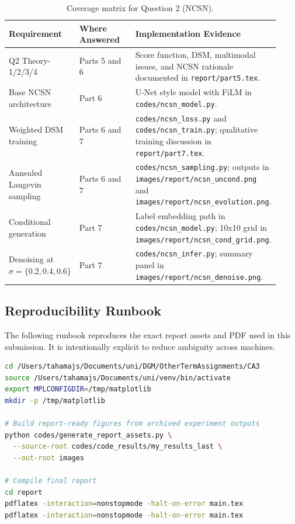 \begin{table}[H]
\centering
\caption{Coverage matrix for Question 2 (NCSN).}
\label{tab:coverage-q2}
\begin{tabular}{@{}p{0.18\linewidth}p{0.27\linewidth}p{0.47\linewidth}@{}}
\toprule
\textbf{Requirement} & \textbf{Where Answered} & \textbf{Implementation Evidence} \\
\midrule
Q2 Theory-1/2/3/4 & Parts 5 and 6 & Score function, DSM, multimodal issues,
and NCSN rationale documented in \texttt{report/part5.tex}. \\
Base NCSN architecture & Part 6 & U-Net style model with FiLM in
\texttt{codes/ncsn\_model.py}. \\
Weighted DSM training & Parts 6 and 7 &
\texttt{codes/ncsn\_loss.py} and \texttt{codes/ncsn\_train.py}; qualitative
training discussion in \texttt{report/part7.tex}. \\
Annealed Langevin sampling & Parts 6 and 7 &
\texttt{codes/ncsn\_sampling.py}; outputs in
\texttt{images/report/ncsn\_uncond.png} and
\texttt{images/report/ncsn\_evolution.png}. \\
Conditional generation & Part 7 & Label embedding path in
\texttt{codes/ncsn\_model.py}; 10x10 grid in
\texttt{images/report/ncsn\_cond\_grid.png}. \\
Denoising at $\sigma=\{0.2,0.4,0.6\}$ & Part 7 &
\texttt{codes/ncsn\_infer.py}; summary panel in
\texttt{images/report/ncsn\_denoise.png}. \\
\bottomrule
\end{tabular}
\end{table}

\subsection{Reproducibility Runbook}

The following runbook reproduces the exact report assets and PDF used in this
submission. It is intentionally explicit to reduce ambiguity across machines.

\begin{lstlisting}[language=bash, caption={Minimal runbook for regenerating report assets and PDF.}]
cd /Users/tahamajs/Documents/uni/DGM/OtherTermAssignments/CA3
source /Users/tahamajs/Documents/uni/venv/bin/activate
export MPLCONFIGDIR=/tmp/matplotlib
mkdir -p /tmp/matplotlib

# Build report-ready figures from archived experiment outputs
python codes/generate_report_assets.py \
  --source-root codes/code_results/my_results_last \
  --out-root images

# Compile final report
cd report
pdflatex -interaction=nonstopmode -halt-on-error main.tex
pdflatex -interaction=nonstopmode -halt-on-error main.tex
\end{lstlisting}

